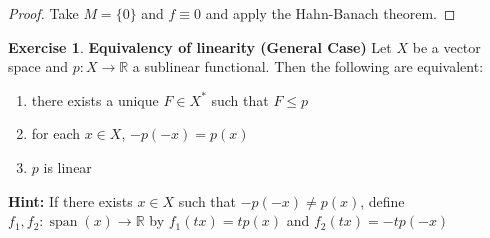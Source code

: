 \documentclass[12pt]{amsart}
\theoremstyle{definition}
\newtheorem{ex}[definition]{Exercise}
\newcommand{\R}{\mathbb{R}}
\DeclareMathOperator{\spn}{span}
\begin{document}
	\begin{proof}
	Take $M = \{0\}$ and $f \equiv 0$ and apply the Hahn-Banach theorem.
	\end{proof}	
	
	\begin{ex}\textbf{Equivalency of linearity (General Case)}
	Let $X$ be a vector space and $p:X \rightarrow \R$ a sublinear functional. Then the following are equivalent:
	\begin{enumerate}
	\item there exists a unique $F \in X^*$ such that $F \leq p$
	\item for each $x \in X$, $-p(-x) = p(x)$
	\item $p$ is linear
\end{enumerate}	
\textbf{Hint:} If there exists $x \in X$ such that $-p(-x) \neq p(x)$, define $f_1,f_2 :\spn(x) \rightarrow \R$ by $f_1(tx) = t p(x)$ and $f_2(tx) = -tp(-x)$
	\end{ex}	
	
\end{document}
